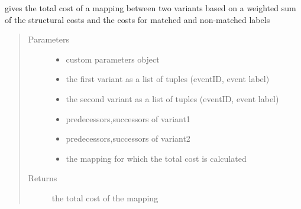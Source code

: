 \documentclass[letterpaper,10pt,english]{sphinxmanual}
\begin{document}
\begin{fulllineitems}
\label{\detokenize{cost function:costFunction.cost.costMapping}}
gives the total cost of a mapping between two variants based on a weighted sum of the structural costs and the costs for matched and non-matched labels
\begin{quote}\begin{description}
\item[{Parameters}] \leavevmode\begin{itemize}
\item {} 
 \textendash{} custom parameters object

\item {} 
 \textendash{} the first variant as a list of tuples (eventID, event label)

\item {} 
 \textendash{} the second variant as a list of tuples (eventID, event label)

\item {} 
 \textendash{} predecessors,successors of variant1

\item {} 
 \textendash{} predecessors,successors of variant2

\item {} 
 \textendash{} the mapping for which the total cost is calculated

\end{itemize}

\item[{Returns}] \leavevmode
the total cost of the mapping

\end{description}\end{quote}

\end{fulllineitems}

\end{document}
